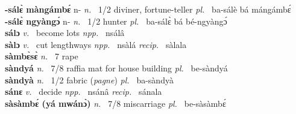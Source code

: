 {\bfseries -sálɛ̀ màngámbɛ́} n- {\itshape n.~} 1/2 diviner, fortune-teller {\itshape pl.~} ba-sálè bá mángámbɛ́    \\ 
{\bfseries -sálɛ̀ ngyàngɔ́} n- {\itshape n.~} 1/2 hunter {\itshape pl.~} ba-sálɛ̀ bá bé-ngyàngɔ́    \\ 
{\bfseries sálɔ}  {\itshape v.~} become lots   {\itshape npp.~} nsálâ  \\ 
{\bfseries sàlɔ}  {\itshape v.~} cut lengthways   {\itshape npp.~} nsàlá  {\itshape recip.~} sàlala  \\ 
{\bfseries sàmbɛ̀sɛ̀}  {\itshape n.~} 7 rape    \\ 
{\bfseries sàndyá}  {\itshape n.~} 7/8 raffia mat for house building {\itshape pl.~} be-sàndyá    \\ 
{\bfseries sàndyà}  {\itshape n.~} 1/2 fabric ({\itshape pagne}) {\itshape pl.~} ba-sàndyà    \\ 
{\bfseries sánɛ}  {\itshape v.~} decide   {\itshape npp.~} nsánâ {\itshape recip.~} sánala  \\ 
{\bfseries sàsàmbɛ́ (yá mwánɔ̀)}  {\itshape n.~} 7/8 miscarriage {\itshape pl.~} be-sàsàmbɛ́    \\ 

